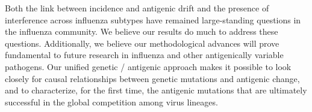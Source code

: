 \documentclass[stdletter,letterpaper,addrfromright,orderfromdateto,dateleft,11pt,noaddrto,sigleft]{newlfm}
\begin{document}
\begin{newlfm}
Both the link between incidence and antigenic drift and the presence of interference across influenza subtypes have remained large-standing questions in the influenza community.
We believe our results do much to address these questions.
Additionally, we believe our methodological advances will prove fundamental to future research in influenza and other antigenically variable pathogens.
Our unified genetic / antigenic approach makes it possible to look closely for causal relationships between genetic mutations and antigenic change, and to characterize, for the first time, the antigenic mutations that are ultimately successful in the global competition among virus lineages.

\end{newlfm}
\end{document}
